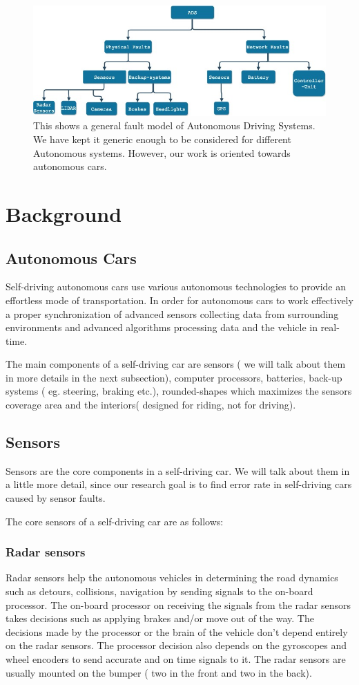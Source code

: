 
\begin{figure}
	\centering
	\includegraphics[width=0.7\linewidth]{Fault-modelgeneral}
	\caption[Fault-model for ADS]{This shows a general fault model of Autonomous Driving Systems. We have kept it generic enough to be considered for different Autonomous systems. However, our work is oriented towards autonomous cars.}
	\label{fig:fault-modelgeneral}
\end{figure}
\section{Background}
\subsection{ Autonomous Cars}
Self-driving autonomous cars use various autonomous technologies to provide an effortless mode of transportation. In order for autonomous cars to work effectively a proper synchronization of advanced sensors collecting data from surrounding environments and advanced algorithms processing data and the vehicle in real-time.

The main components of a self-driving car are sensors ( we will talk about them in more details in the next subsection), computer processors, batteries, back-up systems ( eg. steering, braking etc.), rounded-shapes which maximizes the sensors coverage area and the interiors( designed for riding, not for driving). 

\subsection{Sensors}
Sensors are the core components in a self-driving car. We will talk about them in a little more detail, since our research goal is to find error rate in self-driving cars caused by sensor faults.

The core sensors of a self-driving car are as follows:
\subsubsection{Radar sensors}
Radar sensors help the autonomous vehicles in determining the road dynamics such as detours, collisions, navigation by sending signals to the on-board processor. The on-board processor on receiving the signals from the radar sensors takes decisions such as applying brakes and/or move out of the way. The decisions made by the processor or the brain of the vehicle don't depend entirely on the radar sensors. The processor decision also depends on the gyroscopes and  wheel encoders to send accurate and on time signals to it. The radar sensors are usually mounted on the bumper ( two in the front and two in the back).

